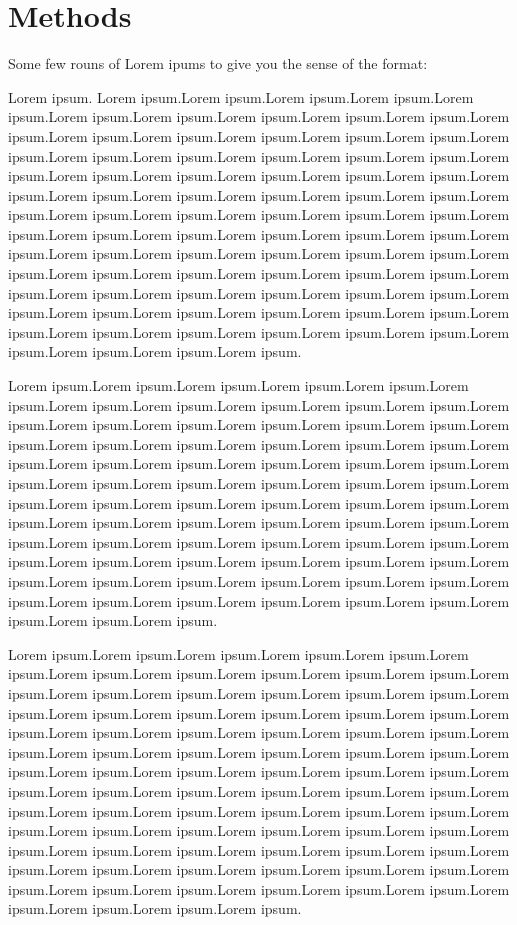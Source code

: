 \documentclass[
  11pt]{article}
\begin{document}
\section{Methods}\label{sec-meth}

Some few rouns of Lorem ipums to give you the sense of the format:

Lorem ipsum. Lorem ipsum.Lorem ipsum.Lorem ipsum.Lorem ipsum.Lorem
ipsum.Lorem ipsum.Lorem ipsum.Lorem ipsum.Lorem ipsum.Lorem ipsum.Lorem
ipsum.Lorem ipsum.Lorem ipsum.Lorem ipsum.Lorem ipsum.Lorem ipsum.Lorem
ipsum.Lorem ipsum.Lorem ipsum.Lorem ipsum.Lorem ipsum.Lorem ipsum.Lorem
ipsum.Lorem ipsum.Lorem ipsum.Lorem ipsum.Lorem ipsum.Lorem ipsum.Lorem
ipsum.Lorem ipsum.Lorem ipsum.Lorem ipsum.Lorem ipsum.Lorem ipsum.Lorem
ipsum.Lorem ipsum.Lorem ipsum.Lorem ipsum.Lorem ipsum.Lorem ipsum.Lorem
ipsum.Lorem ipsum.Lorem ipsum.Lorem ipsum.Lorem ipsum.Lorem ipsum.Lorem
ipsum.Lorem ipsum.Lorem ipsum.Lorem ipsum.Lorem ipsum.Lorem ipsum.Lorem
ipsum.Lorem ipsum.Lorem ipsum.Lorem ipsum.Lorem ipsum.Lorem ipsum.Lorem
ipsum.Lorem ipsum.Lorem ipsum.Lorem ipsum.Lorem ipsum.Lorem ipsum.Lorem
ipsum.Lorem ipsum.Lorem ipsum.Lorem ipsum.Lorem ipsum.Lorem ipsum.Lorem
ipsum.Lorem ipsum.Lorem ipsum.Lorem ipsum.Lorem ipsum.Lorem ipsum.Lorem
ipsum.Lorem ipsum.Lorem ipsum.Lorem ipsum.

Lorem ipsum.Lorem ipsum.Lorem ipsum.Lorem ipsum.Lorem ipsum.Lorem
ipsum.Lorem ipsum.Lorem ipsum.Lorem ipsum.Lorem ipsum.Lorem ipsum.Lorem
ipsum.Lorem ipsum.Lorem ipsum.Lorem ipsum.Lorem ipsum.Lorem ipsum.Lorem
ipsum.Lorem ipsum.Lorem ipsum.Lorem ipsum.Lorem ipsum.Lorem ipsum.Lorem
ipsum.Lorem ipsum.Lorem ipsum.Lorem ipsum.Lorem ipsum.Lorem ipsum.Lorem
ipsum.Lorem ipsum.Lorem ipsum.Lorem ipsum.Lorem ipsum.Lorem ipsum.Lorem
ipsum.Lorem ipsum.Lorem ipsum.Lorem ipsum.Lorem ipsum.Lorem ipsum.Lorem
ipsum.Lorem ipsum.Lorem ipsum.Lorem ipsum.Lorem ipsum.Lorem ipsum.Lorem
ipsum.Lorem ipsum.Lorem ipsum.Lorem ipsum.Lorem ipsum.Lorem ipsum.Lorem
ipsum.Lorem ipsum.Lorem ipsum.Lorem ipsum.Lorem ipsum.Lorem ipsum.Lorem
ipsum.Lorem ipsum.Lorem ipsum.Lorem ipsum.Lorem ipsum.Lorem ipsum.Lorem
ipsum.Lorem ipsum.Lorem ipsum.Lorem ipsum.Lorem ipsum.Lorem ipsum.Lorem
ipsum.Lorem ipsum.Lorem ipsum.

Lorem ipsum.Lorem ipsum.Lorem ipsum.Lorem ipsum.Lorem ipsum.Lorem
ipsum.Lorem ipsum.Lorem ipsum.Lorem ipsum.Lorem ipsum.Lorem ipsum.Lorem
ipsum.Lorem ipsum.Lorem ipsum.Lorem ipsum.Lorem ipsum.Lorem ipsum.Lorem
ipsum.Lorem ipsum.Lorem ipsum.Lorem ipsum.Lorem ipsum.Lorem ipsum.Lorem
ipsum.Lorem ipsum.Lorem ipsum.Lorem ipsum.Lorem ipsum.Lorem ipsum.Lorem
ipsum.Lorem ipsum.Lorem ipsum.Lorem ipsum.Lorem ipsum.Lorem ipsum.Lorem
ipsum.Lorem ipsum.Lorem ipsum.Lorem ipsum.Lorem ipsum.Lorem ipsum.Lorem
ipsum.Lorem ipsum.Lorem ipsum.Lorem ipsum.Lorem ipsum.Lorem ipsum.Lorem
ipsum.Lorem ipsum.Lorem ipsum.Lorem ipsum.Lorem ipsum.Lorem ipsum.Lorem
ipsum.Lorem ipsum.Lorem ipsum.Lorem ipsum.Lorem ipsum.Lorem ipsum.Lorem
ipsum.Lorem ipsum.Lorem ipsum.Lorem ipsum.Lorem ipsum.Lorem ipsum.Lorem
ipsum.Lorem ipsum.Lorem ipsum.Lorem ipsum.Lorem ipsum.Lorem ipsum.Lorem
ipsum.Lorem ipsum.Lorem ipsum.Lorem ipsum.Lorem ipsum.Lorem ipsum.Lorem
ipsum.Lorem ipsum.Lorem ipsum.Lorem ipsum.
\end{document}

